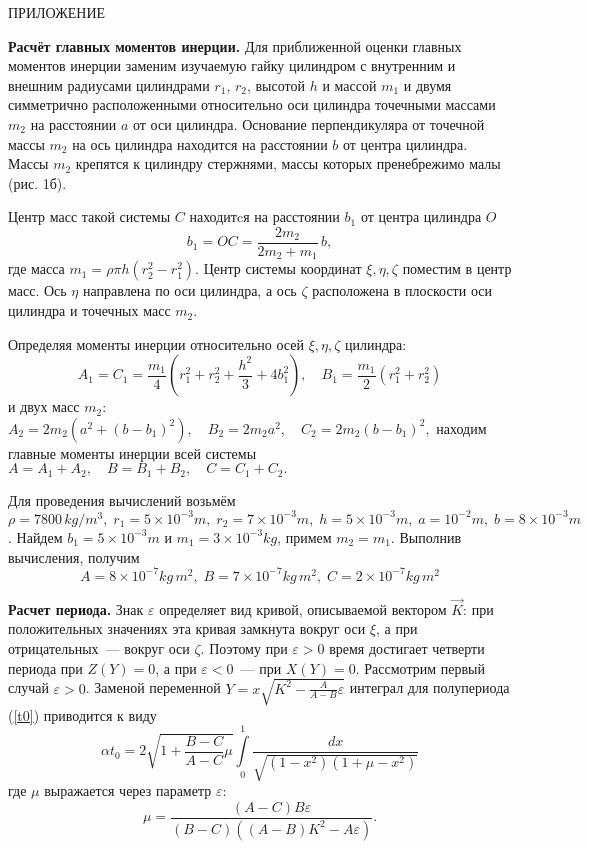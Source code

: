 \documentclass[14pt,a4paper]{extarticle}
\def\DS{\displaystyle}
\def\eps{\varepsilon}
\begin{document}
\smallskip

ПРИЛОЖЕНИЕ

{\bf Расчёт главных моментов инерции.} Для приближенной оценки главных моментов инерции заменим изучаемую гайку цилиндром с внутренним и внешним радиусами цилиндрами $r_1,\,r_2$, высотой $h$ и массой $m_1$ и двумя симметрично расположенными относительно оси цилиндра точечными массами $m_2$ на расстоянии $a$ от оси цилиндра. Основание перпендикуляра от точечной массы $m_2$ на ось цилиндра находится на расстоянии $b$ от центра цилиндра. Массы $m_2$ крепятся к цилиндру стержнями, массы которых пренебрежимо малы (рис. 1б). 

Центр масс такой системы $C$ находитcя на расстоянии $b_1$ от центра цилиндра $O$
$$
b_1=OC=\frac{2m_2}{2m_2+m_1}\,b,
$$
где масса $m_1=\rho\pi h(r_2^2-r_1^2).$
Центр системы координат $\xi,\eta,\zeta$ поместим в центр масс. Ось $\eta$ направлена по оси цилиндра, а ось $\zeta$ расположена в плоскости  оси цилиндра и точечных масс $m_2$. 

Определяя моменты инерции относительно осей $\xi,\eta,\zeta$ цилиндра: 
$$
A_1=C_1=\frac{m_1}{4}(r_1^2+r_2^2+\frac{h^2}{3}+4b_1^2),\quad B_1=\frac{m_1}{2}(r_1^2+r_2^2)
$$
и двух масс $m_2$: $
A_2=2m_2\left(a^2+(b-b_1)^2\right),\quad B_2=2m_2a^2,\quad C_2=2m_2(b-b_1)^2,
$
находим главные моменты инерции всей системы 
$
A=A_1+A_2,\quad B=B_1+B_2,\quad C=C_1+C_2.
$

Для проведения вычислений возьмём $\rho=7800\, kg/m^3,\;r_1=5\times 10^{-3}m,\;r_2=7\times 10^{-3}m,\;h=5\times 10^{-3}m,\;a=10^{-2}m,\;b=8\times 10^{-3}m$. Найдем $b_1=5\times 10^{-3}m$ и $m_1=3\times 10^{-3}kg$, примем $m_2=m_1$.
Выполнив вычисления, получим
$$A=8\times 10^{-7}kg\,m^2,\;B=7\times 10^{-7}kg\,m^2,\;C=2\times 10^{-7}kg\,m^2$$

{\bf Расчет периода.} Знак $\varepsilon$ определяет вид кривой, описываемой вектором $\vec{K}$: при положительных значениях эта кривая замкнута вокруг оси $\xi$, а при отрицательных~--- вокруг оси $\zeta$. Поэтому при $\varepsilon>0$ время достигает четверти периода при $Z(Y)=0$, а при $\varepsilon<0$~--- при $X(Y)=0$. Рассмотрим первый случай $\eps>0$. Заменой переменной 
$
Y=x\sqrt{K^2-\frac{A}{A-B}\eps}
$
интеграл для полупериода (\ref{t0})  приводится к виду
$$
\DS \alpha t_0=2\sqrt{1+\frac{B-C}{A-C}\mu}\int\limits_0^1\frac{dx}{\sqrt{(1-x^2)(1+\mu-x^2)}}
$$
где $\mu$ выражается через параметр $\eps$:
$$\mu =\frac{\left( A-C\right) B\eps}{\left(
B-C\right) \left( \left( A-B\right) K^{2}-A\eps\right) }.$$
\end{document}
